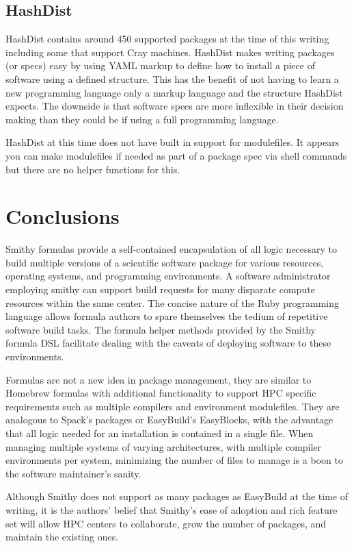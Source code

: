 \documentclass{acm_proc_article-sp}
\begin{document}
\subsection{HashDist}

HashDist contains around 450 supported packages at the time of this writing
including some that support Cray machines.  HashDist makes writing packages (or
specs) easy by using YAML markup to define how to install a piece of software
using a defined structure. This has the benefit of not having to learn a new
programming language only a markup language and the structure HashDist
expects. The downside is that software specs are more inflexible in their
decision making than they could be if using a full programming language.

HashDist at this time does not have built in support for modulefiles. It appears
you can make modulefiles if needed as part of a package spec via shell
commands but there are no helper functions for this.

\section{Conclusions}

Smithy formulas provide a self-contained encapsulation of all logic necessary to
build multiple versions of a scientific software package for various resources,
operating systems, and programming environments. A software administrator
employing smithy can support build requests for many disparate compute resources
within the same center. The concise nature of the Ruby programming language
allows formula authors to spare themselves the tedium of repetitive software
build tasks. The formula helper methods provided by the Smithy formula DSL
facilitate dealing with the caveats of deploying software to these environments.

Formulas are not a new idea in package management, they are similar to Homebrew
formulas with additional functionality to support HPC specific requirements such
as multiple compilers and environment modulefiles. They are analogous to Spack's
packages or EasyBuild's EasyBlocks, with the advantage that all logic needed for
an installation is contained in a single file. When managing multiple systems of
varying architectures, with multiple compiler environments per system,
minimizing the number of files to manage is a boon to the software maintainer's
sanity.

Although Smithy does not support as many packages as EasyBuild at the time of
writing, it is the authors' belief that Smithy's ease of adoption and rich
feature set will allow HPC centers to collaborate, grow the number of packages,
and maintain the existing ones.
\end{document}
